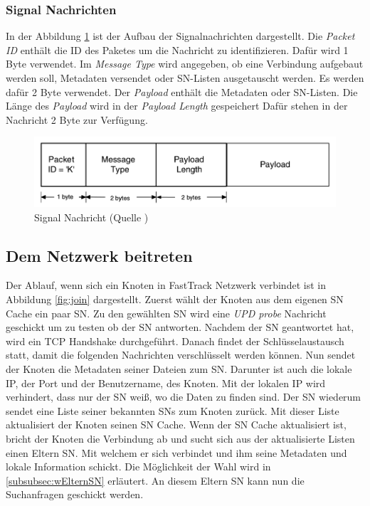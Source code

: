 \subsubsection{Signal Nachrichten}
\label{subsubsec:sigN}

In der Abbildung \ref{fig:sigN} ist der Aufbau der Signalnachrichten dargestellt.
Die \textit{Packet ID} enthält die ID des Paketes um die Nachricht zu identifizieren.
Dafür wird 1 Byte verwendet.
Im \textit{Message Type} wird angegeben, ob eine Verbindung aufgebaut werden soll, Metadaten versendet oder SN-Listen ausgetauscht werden.
Es werden dafür 2 Byte verwendet.
Der \textit{Payload} enthält die Metadaten oder SN-Listen.
Die Länge des \textit{Payload} wird in der \textit{Payload Length} gespeichert
Dafür stehen in der Nachricht 2 Byte zur Verfügung.

\begin{figure}
\includegraphics[scale=0.25]{gfx/signal_message}
\caption{Signal Nachricht (Quelle \cite{liang2006fasttrack})}
\label{fig:sigN}
\end{figure}

\subsection{Dem Netzwerk beitreten}
\label{subsec:join}

Der Ablauf, wenn sich ein Knoten in FastTrack Netzwerk verbindet ist in Abbildung \ref{fig:join} dargestellt.
Zuerst wählt der Knoten aus dem eigenen SN Cache ein paar SN.
Zu den gewählten SN wird eine \textit{UPD probe} Nachricht geschickt um zu testen ob der SN antworten.
Nachdem der SN geantwortet hat, wird ein TCP Handshake durchgeführt. 
Danach findet der Schlüsselaustausch statt, damit die folgenden Nachrichten verschlüsselt werden können.
Nun sendet der Knoten die Metadaten seiner Dateien zum SN.
Darunter ist auch die lokale IP, der Port und der Benutzername, des Knoten.
Mit der lokalen IP wird verhindert, dass nur der SN weiß, wo die Daten zu finden sind.
Der SN wiederum sendet eine Liste seiner bekannten SNs zum Knoten zurück.
Mit dieser Liste aktualisiert der Knoten seinen SN Cache.
Wenn der SN Cache aktualisiert ist, bricht der Knoten die Verbindung ab und sucht sich aus der aktualisierte Listen einen Eltern SN. 
Mit welchem er sich verbindet und ihm seine Metadaten und lokale Information schickt.
Die Möglichkeit der Wahl wird in \ref{subsubsec:wElternSN} erläutert.
An diesem Eltern SN kann nun die Suchanfragen geschickt werden.

